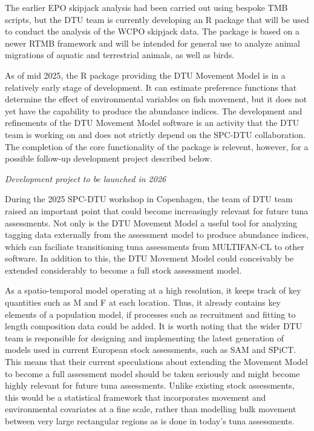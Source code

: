 \documentclass{SCreport}
\begin{document}
The earlier EPO skipjack analysis had been carried out using bespoke TMB
scripts, but the DTU team is currently developing an R package that will be used
to conduct the analysis of the WCPO skipjack data. The package is based on a
newer RTMB framework and will be intended for general use to analyze animal
migrations of aquatic and terrestrial animals, as well as birds.

As of mid 2025, the R package providing the DTU Movement Model is in a
relatively early stage of development. It can estimate preference functions that
determine the effect of environmental variables on fish movement, but it does
not yet have the capability to produce the abundance indices. The development
and refinements of the DTU Movement Model software is an activity that the DTU
team is working on and does not strictly depend on the SPC-DTU collaboration.
The completion of the core functionality of the package is relevent, however,
for a possible follow-up development project described below.

\textit{Development project to be launched in 2026}

During the 2025 SPC-DTU workshop in Copenhagen, the team of DTU team raised an
important point that could become increasingly relevant for future tuna
assessments. Not only is the DTU Movement Model a useful tool for analyzing
tagging data externally from the assessment model to produce abundance indices,
which can faciliate transitioning tuna assessments from MULTIFAN-CL to other
software. In addition to this, the DTU Movement Model could conceivably be
extended considerably to become a full stock assessment model.

As a spatio-temporal model operating at a high resolution, it keeps track of key
quantities such as M and F at each location. Thus, it already contains key
elements of a population model, if processes such as recruitment and fitting to
length composition data could be added. It is worth noting that the wider DTU
team is responsible for designing and implementing the latest generation of
models used in current European stock assessments, such as SAM and SPiCT. This
means that their current speculations about extending the Movement Model to
become a full assessment model should be taken seriously and might become highly
relevant for future tuna assessments. Unlike existing stock assessments, this
would be a statistical framework that incorporates movement and environmental
covariates at a fine scale, rather than modelling bulk movement between very
large rectangular regions as is done in today's tuna assessments.
\end{document}
